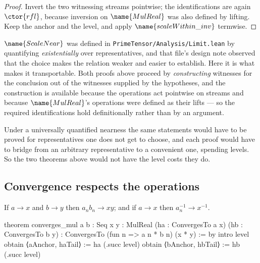 \begin{proof}
Invert the two witnessing streams pointwise; the identifications are again
$\ctor{rfl}$, because inversion on $\name{MulReal}$ was also defined by lifting.
Keep the anchor and the level, and apply $\name{scaleWithin\_inv}$ termwise.
\end{proof}

\begin{remark}
\label{Analysis:Near:Laws:rem:existential}
$\name{ScaleNear}$ was defined in
\texttt{PrimeTensor/Analysis/Limit.lean} by quantifying \emph{existentially}
over representatives, and that file's design note observed that the choice
makes the relation weaker and easier to establish.  Here it is what makes it
transportable.  Both proofs above proceed by \emph{constructing} witnesses for
the conclusion out of the witnesses supplied by the hypotheses, and the
construction is available because the operations act pointwise on streams and
because $\name{MulReal}$'s operations were defined as their lifts --- so the
required identifications hold definitionally rather than by an argument.

Under a universally quantified nearness the same statements would have to be
proved for representatives one does not get to choose, and each proof would
have to bridge from an arbitrary representative to a convenient one, spending
levels.  So the two theorems above would not have the level costs they do.
\end{remark}

\subsection{Convergence respects the operations}

\begin{theorem}
\label{Analysis:Near:Laws:thm:converges}
If $a \to x$ and $b \to y$ then $a_n b_n \to xy$; and if $a \to x$ then
$a_n^{-1} \to x^{-1}$.
\end{theorem}

\begin{leancode}
theorem converges_mul {a b : Seq} {x y : MulReal}
    (ha : ConvergesTo a x)
    (hb : ConvergesTo b y) :
    ConvergesTo (fun n => a n * b n) (x * y) := by
  intro level
  obtain ⟨aAnchor, haTail⟩ := ha (.succ level)
  obtain ⟨bAnchor, hbTail⟩ := hb (.succ level)
\end{leancode}

